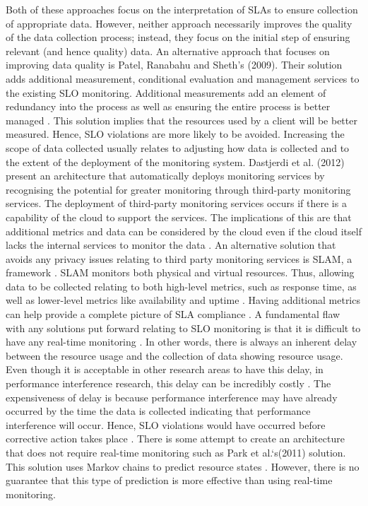 Both of these approaches focus on the interpretation of SLAs to ensure
collection of appropriate data. However, neither approach necessarily
improves the quality of the data collection process; instead, they focus
on the initial step of ensuring relevant (and hence quality) data. An
alternative approach that focuses on improving data quality is
Patel, Ranabahu and Sheth's (2009). Their solution adds additional
measurement, conditional evaluation and management services to the
existing SLO monitoring. Additional measurements add an element of
redundancy into the process as well as ensuring the entire process is
better managed \cite{patel2009service}. This solution implies that the
resources used by a client will be better measured. Hence, SLO
violations are more likely to be avoided.
\newline\newline
Increasing the scope of data collected usually relates to adjusting how
data is collected and to the extent of the deployment of the monitoring
system. Dastjerdi et al. (2012) present an architecture that
automatically deploys monitoring services by recognising the potential
for greater monitoring through third-party monitoring services. The
deployment of third-party monitoring services occurs if there is a
capability of the cloud to support the services. The implications of
this are that additional metrics and data can be considered by the cloud
even if the cloud itself lacks the internal services to monitor the data \cite{dastjerdi2012autonomous}. An alternative solution that avoids any
privacy issues relating to third party monitoring services is SLAM, a
framework \cite{moustafa2015sla}. SLAM monitors both physical and
virtual resources. Thus, allowing data to be collected relating to both
high-level metrics, such as response time, as well as lower-level
metrics like availability and uptime \cite{moustafa2015slam}. Having additional metrics can help provide a complete
picture of SLA compliance \cite{labidi2017cloud}.
\newline\newline
A fundamental flaw with any solutions put forward relating to SLO
monitoring is that it is difficult to have any real-time monitoring \cite{katsaros2011building}. In other words, there is always an
inherent delay between the resource usage and the collection of data
showing resource usage. Even though it is acceptable in other research
areas to have this delay, in performance interference research, this
delay can be incredibly costly \cite{park2011markov}. The expensiveness of delay is because
performance interference may have already occurred by the time the data
is collected indicating that performance interference will occur. Hence,
SLO violations would have occurred before corrective action takes place \cite{aceto2013cloud}. There is some attempt to
create an architecture that does not require real-time monitoring such
as Park et al.`s(2011) solution. This solution uses Markov chains to predict
resource states \cite{park2011markov}. However, there is no guarantee that this type of
prediction is more effective than using real-time monitoring.
